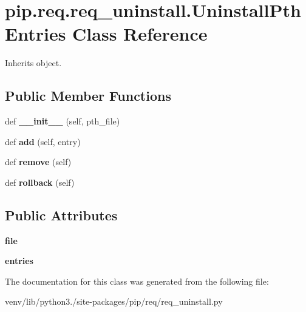 \hypertarget{classpip_1_1req_1_1req__uninstall_1_1_uninstall_pth_entries}{}\section{pip.\+req.\+req\+\_\+uninstall.\+Uninstall\+Pth\+Entries Class Reference}
\label{classpip_1_1req_1_1req__uninstall_1_1_uninstall_pth_entries}


Inherits object.

\subsection*{Public Member Functions}
\begin{DoxyCompactItemize}
\item 
\mbox{\label{classpip_1_1req_1_1req__uninstall_1_1_uninstall_pth_entries_af2765f760f4b4c0c2776af068df0c786}} 
def {\bfseries \+\_\+\+\_\+init\+\_\+\+\_\+} (self, pth\+\_\+file)
\item 
\mbox{\label{classpip_1_1req_1_1req__uninstall_1_1_uninstall_pth_entries_a7cece5c1b5717f6d49c313f35dbfda59}} 
def {\bfseries add} (self, entry)
\item 
\mbox{\label{classpip_1_1req_1_1req__uninstall_1_1_uninstall_pth_entries_a39158f2cf55d0c4151ccfa5b3a41ed6e}} 
def {\bfseries remove} (self)
\item 
\mbox{\label{classpip_1_1req_1_1req__uninstall_1_1_uninstall_pth_entries_ac8da367405d21b96e8f1c844a757cdac}} 
def {\bfseries rollback} (self)
\end{DoxyCompactItemize}
\subsection*{Public Attributes}
\begin{DoxyCompactItemize}
\item 
\mbox{\label{classpip_1_1req_1_1req__uninstall_1_1_uninstall_pth_entries_ad073307bd9e6f3aab5c4b6c2fedb61a7}} 
{\bfseries file}
\item 
\mbox{\label{classpip_1_1req_1_1req__uninstall_1_1_uninstall_pth_entries_ae4bee5ec91a1f086810715742980fe93}} 
{\bfseries entries}
\end{DoxyCompactItemize}


The documentation for this class was generated from the following file\+:\begin{DoxyCompactItemize}
\item 
venv/lib/python3./site-\/packages/pip/req/req\+\_\+uninstall.\+py\end{DoxyCompactItemize}

